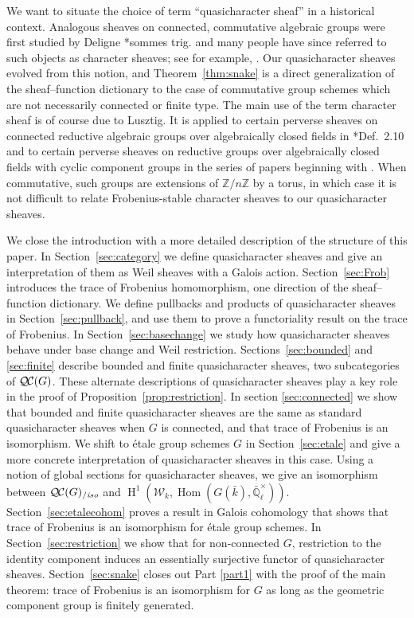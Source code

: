 \documentclass[11pt]{amsart}
\theoremstyle{plain}
\theoremstyle{definition}
\theoremstyle{remark}
\newcommand{\ZZ}{{\mathbb{Z}}}
\newcommand{\EE}{\mathbb{\bar Q}_\ell}
\newcommand{\bFq}{\bar{k}}
\newcommand{\Fq}{k}
\newcommand{\EEx}{\EE^\times}
\DeclareMathOperator{\Hom}{Hom}
\DeclareMathOperator{\Hh}{H}
\newcommand{\QC}{{\mathcal{Q\hskip-0.8pt C}}}
\newcommand{\QCiso}[1]{\QC(#1)_{/\textit{iso}}}
\newcommand{\Weil}[1]{\mathcal{W}_{#1}}
\begin{document}
We want to situate the choice of term ``quasicharacter sheaf'' in a historical context.
Analogous sheaves on connected, commutative algebraic groups were first studied
by Deligne \cite{deligne:SGA4.5}*{sommes trig.} and many people have since referred to such objects
as character sheaves; see for example, \cite{kamgarpour:09a}. 
Our quasicharacter sheaves evolved from this notion, and Theorem~\ref{thm:snake}
is a direct generalization of the sheaf--function dictionary to the case of commutative
group schemes which are not necessarily connected or finite type.  The main use
of the term character sheaf is of course due to Lusztig. It is applied to certain perverse
sheaves on connected reductive algebraic groups over algebraically closed fields in
\cite{lusztig:85a}*{Def.~2.10} and to certain perverse sheaves on reductive groups
over algebraically closed fields with cyclic component groups in the series of papers
beginning with \cite{lusztig:disconnected1}.  
When commutative, such groups are extensions of $\ZZ/n\ZZ$ by a torus,
in which case it is not difficult to relate Frobenius-stable character sheaves to our quasicharacter sheaves.

We close the introduction with a more detailed description of the structure of this paper.
In Section~\ref{sec:category} we define quasicharacter sheaves and give an interpretation of
them as Weil sheaves with a Galois action.
Section~\ref{sec:Frob} introduces the trace of Frobenius homomorphism,
one direction of the sheaf--function dictionary.
We define pullbacks and products of quasicharacter sheaves in Section~\ref{sec:pullback}, and use
them to prove a functoriality result on the trace of Frobenius.
In Section~\ref{sec:basechange} we study how quasicharacter sheaves behave under base change
and Weil restriction.
Sections~\ref{sec:bounded} and \ref{sec:finite} describe bounded and finite quasicharacter sheaves,
two subcategories of $\QC(G)$.  These alternate descriptions of quasicharacter sheaves play a key
role in the proof of Proposition~\ref{prop:restriction}.
In section \ref{sec:connected} we show that bounded and finite quasicharacter sheaves are the same
as standard quasicharacter sheaves when $G$ is connected, and that trace of Frobenius is an isomorphism.
We shift to \'etale group schemes $G$ in Section~\ref{sec:etale} and give a more concrete interpretation
of quasicharacter sheaves in this case.  Using a notion of global sections for quasicharacter sheaves,
we give an isomorphism between $\QCiso{G}$ and $\Hh^1(\Weil{\Fq}, \Hom(G(\bFq), \EEx))$.
Section~\ref{sec:etalecohom} proves a result in Galois cohomology that shows that trace of Frobenius is
an isomorphism for \'etale group schemes.
In Section~\ref{sec:restriction} we show that for non-connected $G$, restriction to the identity component
induces an essentially surjective functor of quasicharacter sheaves.
Section~\ref{sec:snake} closes out Part \ref{part1} with the proof of the main theorem: trace of Frobenius
is an isomorphism for $G$ as long as the geometric component group is finitely generated.
\end{document}
